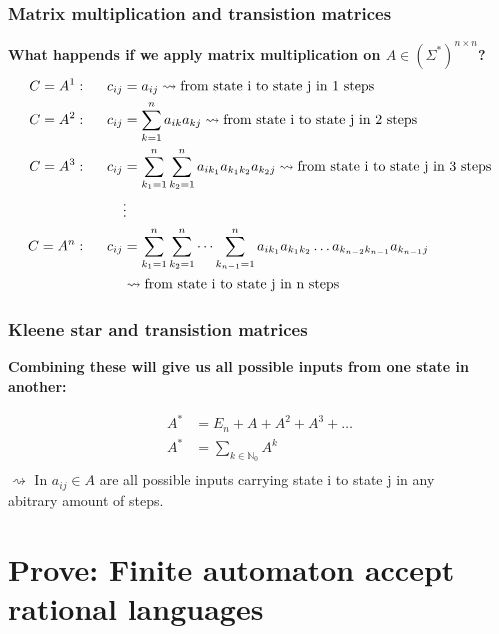\documentclass{beamer}
\begin{document}
\begin{frame}
  \frametitle{Matrix multiplication and transistion matrices}
  {\bf What happends if we apply matrix multiplication on 
  $A \in (\Sigma^*)^{n \times n}$?}
  \begin{equation*}
    \begin{aligned}
      C = A^1: \hspace{0.5cm} c_{ij} &= a_{ij}
      \rightsquigarrow 
      \text{from state i to state j in 1 steps}\\
      C = A^2: \hspace{0.5cm} c_{ij} &= \sum_{k=1}^{n} a_{ik}a_{kj}
      \rightsquigarrow 
      \text{from state i to state j in 2 steps}\\
      C = A^3: \hspace{0.5cm} c_{ij} &= \sum_{k_1=1}^{n}
      \sum_{k_2=1}^{n}a_{ik_1}a_{k_1k_2}a_{k_2j} \rightsquigarrow 
      \text{from state i to state j in 3 steps}\\ 
                          &\vdots\\
      C = A^n: \hspace{0.5cm} c_{ij} &= \sum_{k_1=1}^{n}
      \sum_{k_2=1}^{n}\dots \sum_{k_{n-1}=1}^n 
      a_{ik_1}a_{k_1k_2}\dots a_{k_{n-2}k_{n-1}}a_{k_{n-1}j} \\
        &\rightsquigarrow \text{from state i to state j in n steps}\\ 
    \end{aligned}
  \end{equation*}
\end{frame}

\begin{frame}
  \frametitle{Kleene star and transistion matrices}
  {
    \bf Combining these will give us all possible 
    inputs from one state in another:
  }

  \begin{equation*}
    \begin{aligned}
      A^* &= E_n + A + A^2 + A^3+ \dots \\
      A^* &= \sum_{k \in \mathbb{N}_0} A^k\\
    \end{aligned}
  \end{equation*}
  $\rightsquigarrow \text{ In } a_{ij} \in A$ are all possible inputs
   carrying state i to state j in any \\
   \hspace{0.5cm} abitrary amount of steps.
\end{frame}
\section{Prove: Finite automaton accept rational languages}
\end{document}
